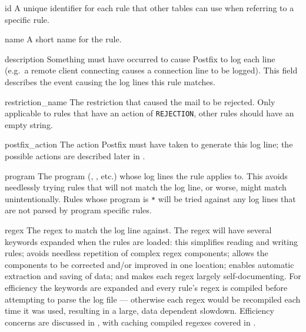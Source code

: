 \begin{eqlist}

    \item [id] A unique identifier for each rule that other tables can use
        when referring to a specific rule.

    \item [name] A short name for the rule.

    \item [description] Something must have occurred to cause Postfix to
        log each line (e.g.\ a remote client connecting causes a connection
        line to be logged).  This field describes the event causing the log
        lines this rule matches.

    \item [restriction\_name] The restriction that caused the mail to be
        rejected.  Only applicable to rules that have an action of
        \texttt{REJECTION}, other rules should have an empty string.

    \item [postfix\_action] The action Postfix must have taken to generate
        this log line; the possible actions are described later in
        .

    \item [program] The program (, , etc.) whose
        log lines the rule applies to.  This avoids needlessly trying rules
        that will not match the log line, or worse, might match
        unintentionally.  Rules whose program is \texttt{*} will be tried
        against any log lines that are not parsed by program specific
        rules.

    \item [regex] The regex to match the log line against.  The regex will
        have several keywords expanded when the rules are loaded: this
        simplifies reading and writing rules; avoids needless repetition of
        complex regex components; allows the components to be corrected
        and/or improved in one location; enables automatic extraction and
        saving of data; and makes each regex largely self-documenting.  For
        efficiency the keywords are expanded and every rule's regex is
        compiled before attempting to parse the log file --- otherwise each
        regex would be recompiled each time it was used, resulting in a
        large, data dependent slowdown.  Efficiency concerns are discussed
        in , with caching compiled regexes
        covered in .


\end{eqlist}
